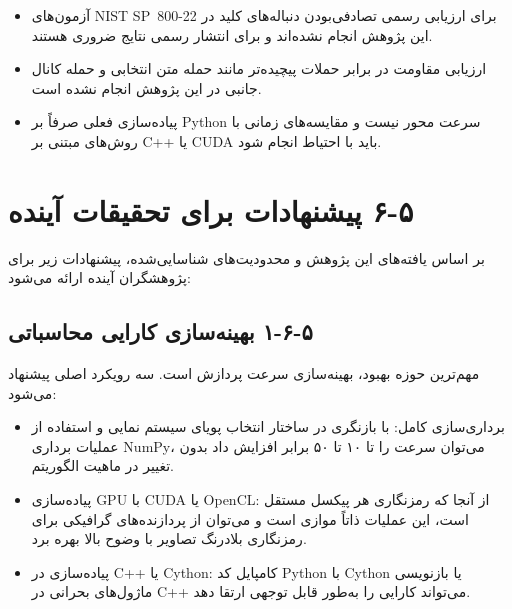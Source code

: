 \begin{itemize}
    \item آزمون‌های NIST SP~800-22 برای ارزیابی رسمی تصادفی‌بودن دنباله‌های کلید در این پژوهش انجام نشده‌اند و برای انتشار رسمی نتایج ضروری هستند.
\end{itemize}

\begin{itemize}
    \item ارزیابی مقاومت در برابر حملات پیچیده‌تر مانند حمله متن انتخابی و حمله کانال جانبی در این پژوهش انجام نشده است.
\end{itemize}

\begin{itemize}
    \item پیاده‌سازی فعلی صرفاً بر Python سرعت محور نیست و مقایسه‌های زمانی با روش‌های مبتنی بر C++ یا CUDA باید با احتیاط انجام شود.
\end{itemize}

\section{‏۵‏-‏۶‏ پیشنهادات برای تحقیقات آینده}

بر اساس یافته‌های این پژوهش و محدودیت‌های شناسایی‌شده، پیشنهادات زیر برای پژوهشگران آینده ارائه می‌شود:

\subsection{‏۵‏-‏۶‏-‏۱‏ بهینه‌سازی کارایی محاسباتی}

مهم‌ترین حوزه بهبود، بهینه‌سازی سرعت پردازش است. سه رویکرد اصلی پیشنهاد می‌شود:

\begin{itemize}
    \item برداری‌سازی کامل: با بازنگری در ساختار انتخاب پویای سیستم نمایی و استفاده از عملیات برداری NumPy، می‌توان سرعت را تا ۱۰ تا ۵۰ برابر افزایش داد بدون تغییر در ماهیت الگوریتم.
\end{itemize}

\begin{itemize}
    \item پیاده‌سازی GPU با CUDA یا OpenCL: از آنجا که رمزنگاری هر پیکسل مستقل است، این عملیات ذاتاً موازی است و می‌توان از پردازنده‌های گرافیکی برای رمزنگاری بلادرنگ تصاویر با وضوح بالا بهره برد.
\end{itemize}

\begin{itemize}
    \item پیاده‌سازی در C++ یا Cython:  کامپایل کد Python با Cython یا بازنویسی ماژول‌های بحرانی در C++  می‌تواند کارایی را به‌طور قابل توجهی ارتقا دهد.
\end{itemize}

